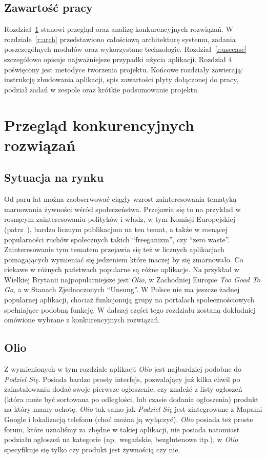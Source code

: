 \documentclass[licencjacka]{pracamgr}
\begin{document}
\section*{Zawartość pracy}
Rozdział~\ref{r:konkurencja} stanowi przegląd oraz analizę konkurencyjnych rozwiązań. W rozdziale~\ref{r:arch} przedstawiono całościową architekturę systemu, zadania poszczególnych modułów oraz wykorzystane technologie. Rozdział~\ref{r:usecase} szczegółowo opisuje najważniejsze przypadki użycia aplikacji. Rozdział 4 poświęcony jest metodyce tworzenia projektu. Końcowe rozdziały zawierają: instrukcję zbudowania aplikacji, spis zawartości płyty dołączonej do pracy, podział zadań w zespole oraz krótkie podsumowanie projektu.

\chapter{Przegląd konkurencyjnych rozwiązań}\label{r:konkurencja}

\section{Sytuacja na rynku}
Od paru lat można zaobserwować ciągły wzrost zainteresowania tematyką marnowania żywności wśród społeczeństwa. Przejawia się to na przykład w rosnącym zainteresowaniu polityków i władz, w tym Komisji Europejskiej (patrz~\cite{ec}), bardzo licznym publikacjom na ten temat, a także w rosnącej popularności ruchów społecznych takich ``freeganizm'', czy ``zero waste''. Zainteresowanie tym tematem przejawia się też w licznych aplikacjach pomagających wymieniać się jedzeniem które inaczej by się zmarnowało. Co ciekawe w różnych państwach popularne są różne aplikacje. Na przykład w Wielkiej Brytanii najpopularniejsze jest \textit{Olio}, w Zachodniej Europie \textit{Too Good To Go}, a w Stanach Zjednoczonych ``Unsung''. W Polsce nie ma jeszcze żadnej popularnej aplikacji, chociaż funkcjonują grupy na portalach społecznościowych spełniające podobną funkcję. W dalszej części tego rozdziału zostaną dokładniej omówione wybrane z konkurencyjnych rozwiązań.

\section{Olio}
Z wymienionych w tym rozdziale aplikacji \textit{Olio} jest najbardziej podobne do \textit{Podziel Się}. Posiada bardzo prosty interfejs, pozwalający już kilka chwil po zainstalowaniu dodać swoje pierwsze ogłoszenie, czy znaleźć z listy ogłoszeń (która może być sortowana po odległości, lub czasie dodania ogłoszenia) produkt na który mamy ochotę. \textit{Olio} tak samo jak \textit{Podziel Się} jest zintegrowane z Mapami Google i lokalizacją telefonu (choć można ją wyłączyć). \textit{Olio} posiada też proste forum, które uznaliśmy za zbędne w takiej aplikacji, nie posiada natomiast podziału ogłoszeń na kategorie (np.\ wegańskie, bezglutenowe itp.), w \textit{Olio} specyfikuje się tylko czy produkt jest żywnością czy nie.
\end{document}
